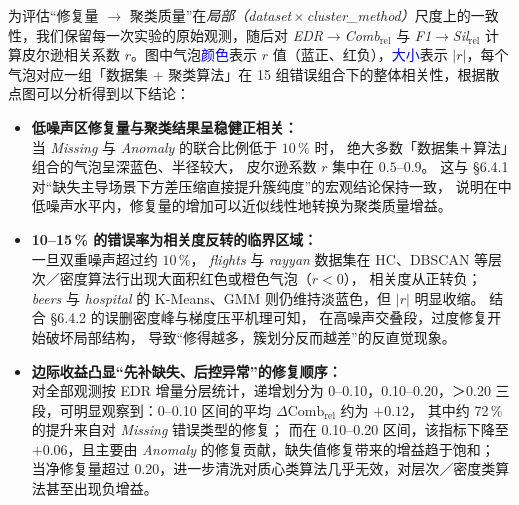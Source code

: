 \documentclass[10pt]{article} %
\numberwithin{equation}{section}
\begin{document}
为评估“修复量 $\rightarrow$ 聚类质量”在\emph{局部（dataset\,$\times$\,cluster\_method）}尺度上的一致性，我们保留每一次实验的原始观测，随后对 \textit{EDR$\!\rightarrow\!$Comb$_{\text{rel}}$} 与 \textit{F1$\!\rightarrow\!$Sil$_{\text{rel}}$} 计算皮尔逊相关系数 $r$。图中气泡\textcolor{blue}{颜色}表示 $r$ 值（蓝正、红负），\textcolor{blue}{大小}表示 $|r|$，每个气泡对应一组「数据集 + 聚类算法」在 15 组错误组合下的整体相关性，根据散点图可以分析得到以下结论：
\begin{itemize}[leftmargin=1.6em,itemsep=4pt]

\item \textbf{低噪声区修复量与聚类结果呈稳健正相关：}  \\
当 \textit{Missing} 与 \textit{Anomaly} 的联合比例低于 $10\,\%$ 时，%
绝大多数「数据集＋算法」组合的气泡呈深蓝色、半径较大，%
皮尔逊系数 $r$ 集中在 $0.5$–$0.9$。%
这与 §6.4.1 对“缺失主导场景下方差压缩直接提升簇纯度”的宏观结论保持一致，%
\textcolor[rgb]{0.00,0.07,1.00}{说明在中低噪声水平内，修复量的增加可以近似线性地转换为聚类质量增益。  }

\item \textbf{10–15\,\% 的错误率为相关度反转的临界区域：}  \\
一旦双重噪声超过约 $10\,\%$，%
\textit{flights} 与 \textit{rayyan} 数据集在 HC、DBSCAN 等层次／密度算法行出现大面积红色或橙色气泡（$r<0$），%
相关度从正转负；%
\textit{beers} 与 \textit{hospital} 的 K-Means、GMM 则仍维持淡蓝色，但 $|r|$ 明显收缩。%
结合 §6.4.2 的误删密度峰与梯度压平机理可知，%
\textcolor[rgb]{0.00,0.07,1.00}{在高噪声交叠段，过度修复开始破坏局部结构，%
导致“修得越多，簇划分反而越差”的反直觉现象。  }

\item \textbf{边际收益凸显“先补缺失、后控异常”的修复顺序：}  \\
对全部观测按 EDR 增量分层统计，递增划分为 0–0.10，0.10–0.20，＞0.20 三段，可明显观察到：0–0.10 区间的平均 $\Delta\text{Comb}_{\text{rel}}$ 约为 $+0.12$，%
其中约 72\,\% 的提升来自对 \textit{Missing} 错误类型的修复；%
而在 0.10–0.20 区间，该指标下降至 $+0.06$，且主要由 \textit{Anomaly} 的修复贡献，缺失值修复带来的增益趋于饱和；  %
\textcolor[rgb]{0.00,0.07,1.00}{当净修复量超过 0.20，进一步清洗对质心类算法几乎无效，对层次／密度类算法甚至出现负增益。}

\end{itemize}


\end{document}
